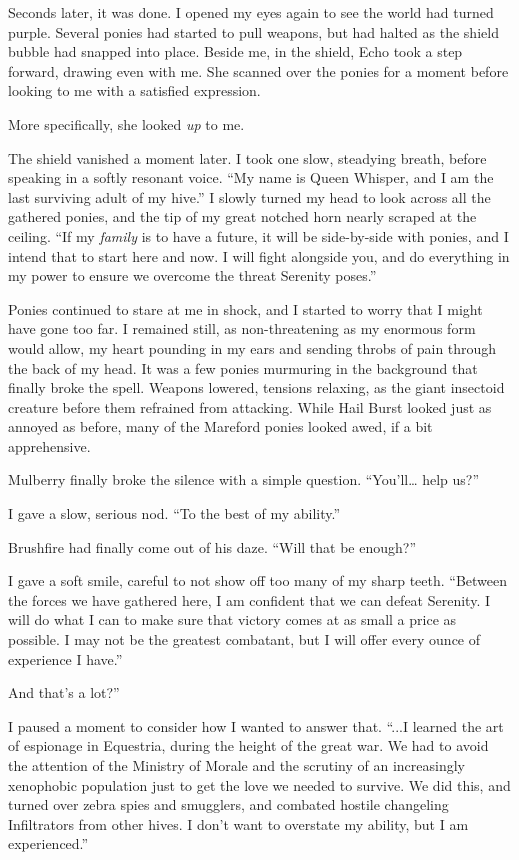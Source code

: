 Seconds later, it was done. I opened my eyes again to see the world had turned purple. Several ponies had started to pull weapons, but had halted as the shield bubble had snapped into place. Beside me, in the shield, Echo took a step forward, drawing even with me. She scanned over the ponies for a moment before looking to me with a satisfied expression.

More specifically, she looked \textit{up} to me.

The shield vanished a moment later. I took one slow, steadying breath, before speaking in a softly resonant voice. “My name is Queen Whisper, and I am the last surviving adult of my hive.” I slowly turned my head to look across all the gathered ponies, and the tip of my great notched horn nearly scraped at the ceiling. “If my \textit{family} is to have a future, it will be side-by-side with ponies, and I intend that to start here and now. I will fight alongside you, and do everything in my power to ensure we overcome the threat Serenity poses.”

Ponies continued to stare at me in shock, and I started to worry that I might have gone too far. I remained still, as non-threatening as my enormous form would allow, my heart pounding in my ears and sending throbs of pain through the back of my head. It was a few ponies murmuring in the background that finally broke the spell. Weapons lowered, tensions relaxing, as the giant insectoid creature before them refrained from attacking. While Hail Burst looked just as annoyed as before, many of the Mareford ponies looked awed, if a bit apprehensive.

Mulberry finally broke the silence with a simple question. “You’ll… help us?”

I gave a slow, serious nod. “To the best of my ability.”

Brushfire had finally come out of his daze. “Will that be enough?”

I gave a soft smile, careful to not show off too many of my sharp teeth. “Between the forces we have gathered here, I am confident that we can defeat Serenity. I will do what I can to make sure that victory comes at as small a price as possible. I may not be the greatest combatant, but I will offer every ounce of experience I have.”

\leavevmode{}And that’s a lot?”

I paused a moment to consider how I wanted to answer that. “...I learned the art of espionage in Equestria, during the height of the great war. We had to avoid the attention of the Ministry of Morale and the scrutiny of an increasingly xenophobic population just to get the love we needed to survive. We did this, and turned over zebra spies and smugglers, and combated hostile changeling Infiltrators from other hives. I don’t want to overstate my ability, but I am experienced.”

